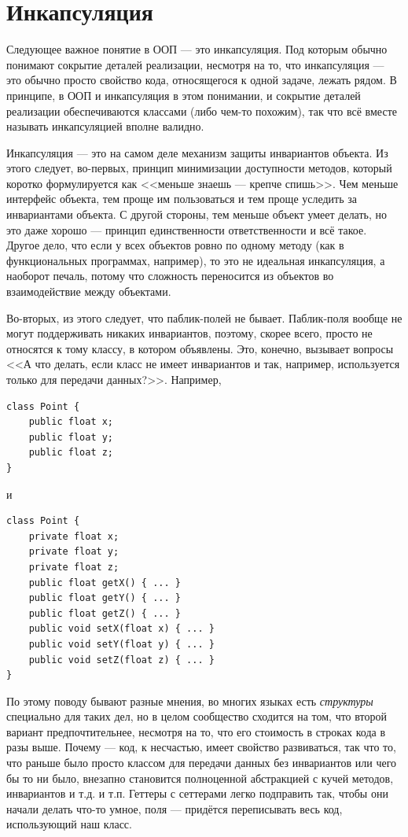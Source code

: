 \documentclass[a5paper]{article}
\begin{document}
\section{Инкапсуляция}

Следующее важное понятие в ООП --- это инкапсуляция. Под которым обычно понимают сокрытие деталей реализации, несмотря на то, что инкапсуляция --- это обычно просто свойство кода, относящегося к одной задаче, лежать рядом. В принципе, в ООП и инкапсуляция в этом понимании, и сокрытие деталей реализации обеспечиваются классами (либо чем-то похожим), так что всё вместе называть инкапсуляцией вполне валидно.

Инкапсуляция --- это на самом деле механизм защиты инвариантов объекта. Из этого следует, во-первых, принцип минимизации доступности методов, который коротко формулируется как <<меньше знаешь --- крепче спишь>>. Чем меньше интерфейс объекта, тем проще им пользоваться и тем проще уследить за инвариантами объекта. С другой стороны, тем меньше объект умеет делать, но это даже хорошо --- принцип единственности ответственности и всё такое. Другое дело, что если у всех объектов ровно по одному методу (как в функциональных программах, например), то это не идеальная инкапсуляция, а наоборот печаль, потому что сложность переносится из объектов во взаимодействие между объектами.

Во-вторых, из этого следует, что паблик-полей не бывает. Паблик-поля вообще не могут поддерживать никаких инвариантов, поэтому, скорее всего, просто не относятся к тому классу, в котором объявлены. Это, конечно, вызывает вопросы <<А что делать, если класс не имеет инвариантов и так, например, используется только для передачи данных?>>. Например,

\begin{verbatim}
class Point {
    public float x;
    public float y;
    public float z;
}
\end{verbatim}

и

\begin{verbatim}
class Point {
    private float x;
    private float y;
    private float z;
    public float getX() { ... }
    public float getY() { ... }
    public float getZ() { ... }
    public void setX(float x) { ... }
    public void setY(float y) { ... }
    public void setZ(float z) { ... }
}
\end{verbatim}

По этому поводу бывают разные мнения, во многих языках есть \emph{структуры} специально для таких дел, но в целом сообщество сходится на том, что второй вариант предпочтительнее, несмотря на то, что его стоимость в строках кода в разы выше. Почему --- код, к несчастью, имеет свойство развиваться, так что то, что раньше было просто классом для передачи данных без инвариантов или чего бы то ни было, внезапно становится полноценной абстракцией с кучей методов, инвариантов и т.д. и т.п. Геттеры с сеттерами легко подправить так, чтобы они начали делать что-то умное, поля --- придётся переписывать весь код, использующий наш класс.
\end{document}
